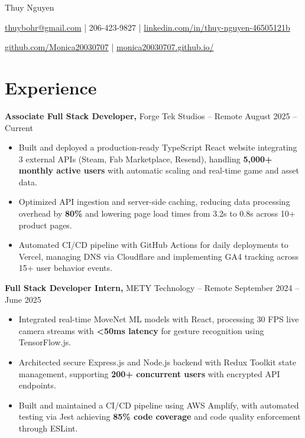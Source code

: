 \documentclass[11pt]{article}
\begin{document}
\centerline{\Huge Thuy Nguyen}

\vspace{5pt}

\centerline{\href{mailto:thuybohr@gmail.com}{thuybohr@gmail.com} | 206-423-9827 |
\href{https://www.linkedin.com/in/thuy-nguyen-46505121b/}{linkedin.com/in/thuy-nguyen-46505121b}}

\centerline{\href{https://github.com/Monica20030707}{github.com/Monica20030707} | 
\href{https://monica20030707.github.io/}{monica20030707.github.io/}} 

\vspace{-9pt}

\section*{Experience}

\textbf{Associate Full Stack Developer,} {Forge Tek Studios} -- Remote \hfill August 2025 -- Current 
\vspace{-9pt}
\begin{itemize}
  \item Built and deployed a production-ready TypeScript React website integrating 3 external APIs (Steam, Fab Marketplace, Resend), handling \textbf{5,000+ monthly active users} with automatic scaling and real-time game and asset data.
  \item Optimized API ingestion and server-side caching, reducing data processing overhead by \textbf{80\%} and lowering page load times from 3.2s to 0.8s across 10+ product pages.
  \item Automated CI/CD pipeline with GitHub Actions for daily deployments to Vercel, managing DNS via Cloudflare and implementing GA4 tracking across 15+ user behavior events.
\end{itemize}

\textbf{Full Stack Developer Intern,} {METY Technology} -- Remote \hfill September 2024 -- June 2025 
\vspace{-9pt}
\begin{itemize}
  \item Integrated real-time MoveNet ML models with React, processing 30 FPS live camera streams with \textbf{<50ms latency} for gesture recognition using TensorFlow.js.
  \item Architected secure Express.js and Node.js backend with Redux Toolkit state management, supporting \textbf{200+ concurrent users} with encrypted API endpoints.
  \item Built and maintained a CI/CD pipeline using AWS Amplify, with automated testing via Jest achieving \textbf{85\% code coverage} and code quality enforcement through ESLint.
\end{itemize}
\end{document}
